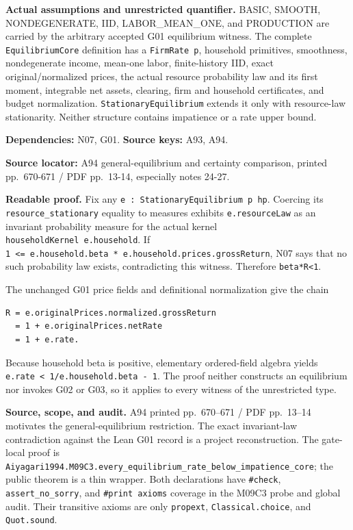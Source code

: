 \documentclass[
  11pt,
]{article}
\let\LedgerOriginalTexttt\texttt
\renewcommand{\texttt}[1]{{\small\LedgerOriginalTexttt{#1}}}
\begin{document}
\textbf{Actual assumptions and unrestricted quantifier.} BASIC, SMOOTH,
NONDEGENERATE, IID, LABOR\_MEAN\_ONE, and PRODUCTION are carried by the
arbitrary accepted G01 equilibrium witness. The complete
\texttt{EquilibriumCore} definition has a \texttt{FirmRate\ p},
household primitives, smoothness, nondegenerate income, mean-one labor,
finite-history IID, exact original/normalized prices, the actual
resource probability law and its first moment, integrable net assets,
clearing, firm and household certificates, and budget normalization.
\texttt{StationaryEquilibrium} extends it only with resource-law
stationarity. Neither structure contains impatience or a rate upper
bound.

\textbf{Dependencies:} N07, G01. \textbf{Source keys:} A93, A94.

\textbf{Source locator:} A94 general-equilibrium and certainty
comparison, printed pp.~670-671 / PDF pp.~13-14, especially notes 24-27.

\textbf{Readable proof.} Fix any
\texttt{e\ :\ StationaryEquilibrium\ p\ hp}. Coercing its
\texttt{resource\_stationary} equality to measures exhibits
\texttt{e.resourceLaw} as an invariant probability measure for the
actual kernel \texttt{householdKernel\ e.household}. If
\texttt{1\ \textless{}=\ e.household.beta\ *\ e.household.prices.grossReturn},
N07 says that no such probability law exists, contradicting this
witness. Therefore \texttt{beta*R\textless{}1}.

The unchanged G01 price fields and definitional normalization give the
chain

\begin{verbatim}
R = e.originalPrices.normalized.grossReturn
  = 1 + e.originalPrices.netRate
  = 1 + e.rate.
\end{verbatim}

Because household beta is positive, elementary ordered-field algebra
yields \texttt{e.rate\ \textless{}\ 1/e.household.beta\ -\ 1}. The proof
neither constructs an equilibrium nor invokes G02 or G03, so it applies
to every witness of the unrestricted type.

\textbf{Source, scope, and audit.} A94 printed pp.~670--671 / PDF
pp.~13--14 motivates the general-equilibrium restriction. The exact
invariant-law contradiction against the Lean G01 record is a project
reconstruction. The gate-local proof is
\texttt{Aiyagari1994.M09C3.every\_equilibrium\_rate\_below\_impatience\_core};
the public theorem is a thin wrapper. Both declarations have
\texttt{\#check}, \texttt{assert\_no\_sorry}, and
\texttt{\#print\ axioms} coverage in the M09C3 probe and global audit.
Their transitive axioms are only \texttt{propext},
\texttt{Classical.choice}, and \texttt{Quot.sound}.
\end{document}

